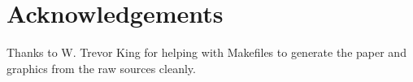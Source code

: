 \documentclass[final,5p,times,twocolumn]{elsarticle}
\begin{document}
\section{Acknowledgements}
Thanks to W. Trevor King for helping with Makefiles to generate the paper and graphics from the raw sources cleanly.



 


\end{document}
